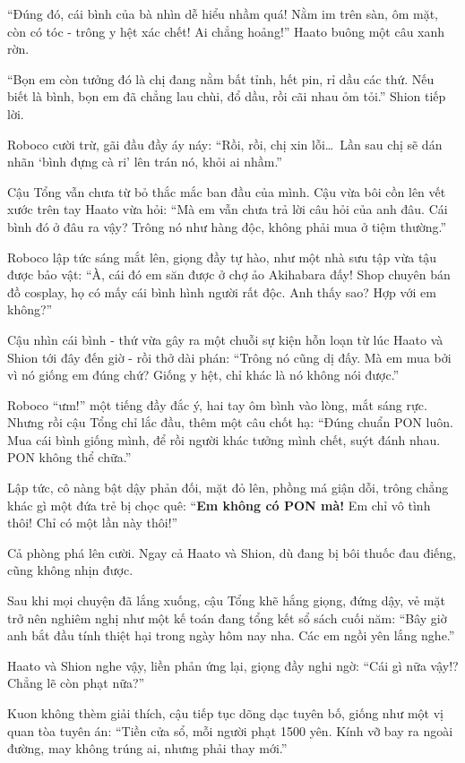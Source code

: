 \documentclass[../main.tex]{subfiles}
\begin{document}
``Đúng đó, cái bình của bà nhìn dễ hiểu nhầm quá! Nằm im trên sàn, ôm mặt, còn có tóc - trông y hệt xác chết! Ai chẳng hoảng!''  Haato buông một câu xanh rờn.

``Bọn em còn tưởng đó là chị đang nằm bất tỉnh, hết pin, rỉ dầu các thứ. Nếu biết là bình, bọn em đã chẳng lau chùi, đổ dầu, rồi cãi nhau ỏm tỏi.''  Shion tiếp lời.

Roboco cười trừ, gãi đầu đầy áy náy: ``Rồi, rồi, chị xin lỗi\dots\ Lần sau chị sẽ dán nhãn `bình đựng cà ri' lên trán nó, khỏi ai nhầm.''

Cậu Tổng vẫn chưa từ bỏ thắc mắc ban đầu của mình. Cậu vừa bôi cồn lên vết xước trên tay Haato vừa hỏi: ``Mà em vẫn chưa trả lời câu hỏi của anh đâu. Cái bình đó ở đâu ra vậy? Trông nó như hàng độc, không phải mua ở tiệm thường.''

Roboco lập tức sáng mắt lên, giọng đầy tự hào, như một nhà sưu tập vừa tậu được bảo vật: ``À, cái đó em săn được ở chợ ảo Akihabara đấy! Shop chuyên bán đồ cosplay, họ có mấy cái bình hình người rất độc. Anh thấy sao? Hợp với em không?''

Cậu nhìn cái bình - thứ vừa gây ra một chuỗi sự kiện hỗn loạn từ lúc Haato và Shion tới đây đến giờ - rồi thở dài phán: ``Trông nó cũng dị đấy. Mà em mua bởi vì nó giống em đúng chứ? Giống y hệt, chỉ khác là nó không nói được.''

Roboco ``ưm!'' một tiếng đầy đắc ý, hai tay ôm bình vào lòng, mắt sáng rực. Nhưng rồi cậu Tổng chỉ lắc đầu, thêm một câu chốt hạ: ``Đúng chuẩn PON luôn. Mua cái bình giống mình, để rồi người khác tưởng mình chết, suýt đánh nhau. PON không thể chữa.''

Lập tức, cô nàng bật dậy phản đối, mặt đỏ lên, phồng má giận dỗi, trông chẳng khác gì một đứa trẻ bị chọc quê: ``\textbf{Em không có PON mà!} Em chỉ vô tình thôi! Chỉ có một lần này thôi!''

Cả phòng phá lên cười. Ngay cả Haato và Shion, dù đang bị bôi thuốc đau điếng, cũng không nhịn được.

Sau khi mọi chuyện đã lắng xuống, cậu Tổng khẽ hắng giọng, đứng dậy, vẻ mặt trở nên nghiêm nghị như một kế toán đang tổng kết sổ sách cuối năm: ``Bây giờ anh bắt đầu tính thiệt hại trong ngày hôm nay nha. Các em ngồi yên lắng nghe.''

Haato và Shion nghe vậy, liền phản ứng lại, giọng đầy nghi ngờ: ``Cái gì nữa vậy!? Chẳng lẽ còn phạt nữa?''

Kuon không thèm giải thích, cậu tiếp tục dõng dạc tuyên bố, giống như một vị quan tòa tuyên án: ``Tiền cửa sổ, mỗi người phạt 1500 yên. Kính vỡ bay ra ngoài đường, may không trúng ai, nhưng phải thay mới.''
\end{document}
